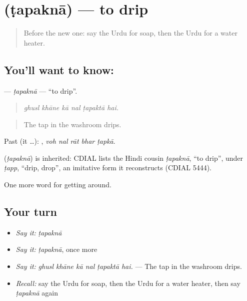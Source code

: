 \section[\texorpdfstring{\ur{ٹپکنا} (ṭapaknā)}{ٹپکنا (ṭapaknā)}]{ (ṭapaknā) — to drip}

\label{lesson:UR-C404-tapakna}



\begin{quote}
Before the new one: say the Urdu for soap, then the Urdu for a water heater.
\end{quote}

\subsection*{You'll want to know: }
\textbf{} — \emph{ṭapaknā} — \textquotedblleft{}to drip\textquotedblright{}.

\begin{quote}
     
\end{quote}

\begin{quote}
\emph{ghusl khāne kā nal ṭapaktā hai.}
\end{quote}

\begin{quote}
The tap in the washroom drips.
\end{quote}

Past (it …):     , \emph{voh nal rāt bhar ṭapkā}.

\begin{cousinweb}
\textbf{} (\emph{ṭapaknā}) is inherited: CDIAL lists the Hindi cousin \emph{ṭapaknā}, \textquotedblleft{}to drip\textquotedblright{}, under \emph{ṭapp}, \textquotedblleft{}drip, drop\textquotedblright{}, an imitative form it reconstructs (CDIAL 5444).
\end{cousinweb}

\begin{grammarlens}[title={What you've built}]
One more word for getting around.
\end{grammarlens}

\subsection*{Your turn}
\begin{itemize}
\raggedright
  \item \emph{Say it:} \emph{ṭapaknā}
  \item \emph{Say it:} \emph{ṭapaknā}, once more
  \item \emph{Say it:} \emph{ghusl khāne kā nal ṭapaktā hai.} — The tap in the washroom drips.
  \item \emph{Recall:} say the Urdu for soap, then the Urdu for a water heater, then say \emph{ṭapaknā} again
\end{itemize}

